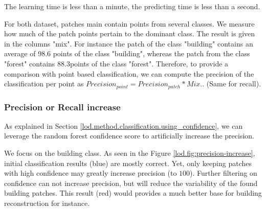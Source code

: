 		The learning time is less than a minute, the predicting time is less than a second. 
		
		For both dataset, patches main contain points from several classes. We measure how much of the patch points pertain to the dominant class. The result is given in the columns "mix". For instance the patch of the class "building" contains an average of 98.6 \mypercent points of the class "building", whereas the patch from the class "forest" contains 88.3\mypercent points of the class "forest".
		Therefore, to provide a comparison with point based classification, we can compute the precision of the classification per point as $Precision_{point} = Precision_{patch} * Mix.$. (Same for recall).
		
		\subsubsection{Precision or Recall increase} 
		
		As explained in Section \ref{lod.method.classification.using_confidence}, we can leverage the random forest confidence score to artificially increase the precision.
	
		We focus on the building class.
		As seen in the Figure \ref{lod.fig:precision-increase}, initial classification results (blue) are mostly correct.
		Yet, only keeping patches with high confidence may greatly increase precision (to $100$\mypercent).
		Further filtering on confidence can not increase precision, but will reduce the variability of the found building patches. 
		This result (red) would provides a much better base for building reconstruction for instance. 
				
